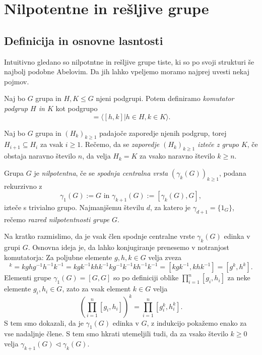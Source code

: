 \section{Nilpotentne in rešljive grupe}

\subsection{Definicija in osnovne lasntosti}

Intuitivno gledano so nilpotntne in rešljive grupe tiste, ki so po svoji strukturi še najbolj podobne Abelovim. Da jih lahko vpeljemo moramo najprej uvesti nekaj pojmov.
\begin{definicija}\label{def_komutator_grup}
    Naj bo $G$ grupa in $H, K \le G$ njeni podgrupi. Potem definiramo \emph{komutator podgrup $H$ in $K$} kot podgrupo \begin{equation*}
        [H, K]  = \langle [h, k] | h \in H, k \in K \rangle.
    \end{equation*}
\end{definicija}

\begin{definicija}
\label{def_iztek_zaporedja}
Naj bo $G$ grupa in $(H_k)_{k \ge 1}$ padajoče zaporedje njenih podgrup, torej $H_{i + 1} \subseteq H_{i}$ za vsak $i \ge 1$. 
Rečemo, da se \emph{zaporedje $(H_k)_{k \ge 1}$ izteče z grupo $K$}, če obstaja naravno število $n$, da velja $H_k = K$ za vsako naravno število $k \ge n$.
\end{definicija}

\begin{definicija}
\label{def_nilpotentna_grupa}
Grupa $G$ je \emph{nilpotentna}, če se \emph{spodnja centralna vrsta} $(\gamma_k(G))_{k \ge 1}$, podana rekurzivno z \begin{equation*}
\gamma_1(G) := G \text{ in } \gamma_{k +1}(G) := [\gamma_k(G), G],
\end{equation*}  
izteče s trivialno grupo. Najmanjšemu številu $d$, za katero je $\gamma_{d + 1} = \{ 1_G \}$, rečemo \emph{razred nilpotentnosti grupe $G$}.    
\end{definicija}

Na kratko razmislimo, da je vsak člen spodnje centralne vrste $\gamma_k(G)$ edinka v grupi $G$. Osnovna ideja je, da lahko konjugiranje prenesemo v notranjost komutatorja: Za poljubne elemente $g, h, k \in G$ velja zveza \begin{equation*}
    [g, h]^k = kghg^{-1}h^{-1}k^{-1} = kgk^{-1}khk^{-1}kg^{-1}k^{-1}kh^{-1}k^{-1} = [kgk^{-1}, khk^{-1}] = [g^k , h^k].
\end{equation*}
Elementi grupe $\gamma_1(G)  = [G , G]$ so po definiciji oblike $\prod_{i = 1}^n [g_i, h_i]$ za neke elemente $g_i, h_i \in G$, zato za vsak element $k \in G$ velja \begin{equation*}
    \left( \prod_{i = 1}^n [g_i, h_i]\right)^k = \prod_{i = 1}^n [g_i^k, h_i^k]. 
\end{equation*}
S tem smo dokazali, da je $\gamma_1(G)$ edinka v $G$, z indukcijo pokažemo enako za vse nadaljnje člene. S tem smo hkrati utemeljili tudi, da za vsako število $k \ge 0$ velja $\gamma_{k+1}(G) \triangleleft \gamma_k(G)$.

